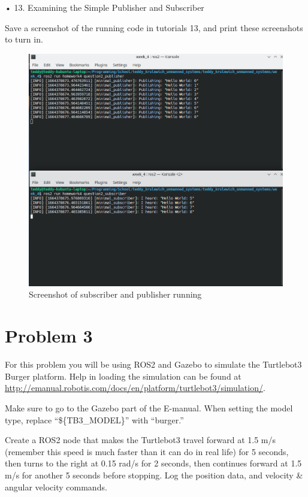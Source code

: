 \documentclass{article}
\begin{document}
• 13. Examining the Simple Publisher and Subscriber 

\bigskip 
\noindent Save a screenshot of the running code in tutorials 13, and print these screenshots to turn in.

\begin{figure}[H]
  \centering
  \includegraphics[width=\textwidth]{question2.png}
  \caption*{Screenshot of subscriber and publisher running}
\end{figure}

\bigskip
\section*{Problem 3}

For this problem you will be using ROS2 and Gazebo to simulate the Turtlebot3 Burger platform.  
Help in loading the simulation can be found at 
\url{http://emanual.robotis.com/docs/en/platform/turtlebot3/simulation/}.

\bigskip
\noindent Make sure to go to the Gazebo part of the E-manual. When setting the model type, replace “\$\{TB3\_MODEL\}” with 
“burger.” 

\bigskip
\noindent Create a ROS2 node that makes the Turtlebot3 travel forward at 1.5 m/s (remember this speed is 
much faster than it can do in real life) for 5 seconds, then turns to the right at 0.15 rad/s for 2 
seconds, then continues forward at 1.5 m/s for another 5 seconds before stopping. Log the position 
data, and velocity \& angular velocity commands.
\end{document}
